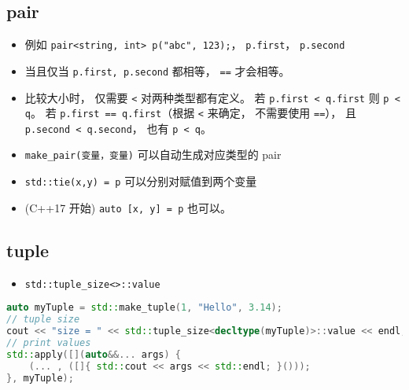 
\begin{issues}
\issueDraft
\end{issues}

\subsection{pair}
\begin{itemize}
\item 例如 \verb`pair<string, int> p("abc", 123);`， \verb`p.first`， \verb`p.second`
\item 当且仅当 \verb`p.first, p.second` 都相等， \verb`==` 才会相等。
\item 比较大小时， 仅需要 \verb`<` 对两种类型都有定义。 若 \verb`p.first < q.first` 则 \verb`p < q`。 若 \verb`p.first == q.first`（根据 \verb`<` 来确定， 不需要使用 \verb`==`）， 且 \verb`p.second < q.second`， 也有 \verb`p < q`。
\item \verb`make_pair(变量，变量)` 可以自动生成对应类型的 pair
\item \verb`std::tie(x,y) = p` 可以分别对赋值到两个变量
\item (C++17 开始) \verb`auto [x, y] = p` 也可以。
\end{itemize}

\subsection{tuple}
\begin{itemize}
\item \verb`std::tuple_size<>::value`
\end{itemize}

\begin{lstlisting}[language=cpp]
auto myTuple = std::make_tuple(1, "Hello", 3.14);
// tuple size
cout << "size = " << std::tuple_size<decltype(myTuple)>::value << endl;
// print values
std::apply([](auto&&... args) {
    (... , ([]{ std::cout << args << std::endl; }()));
}, myTuple);
\end{lstlisting}

